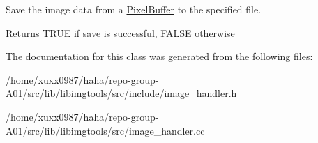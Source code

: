 Save the image data from a \hyperlink{classimage__tools_1_1PixelBuffer}{Pixel\+Buffer} to the specified file. 

\begin{DoxyReturn}{Returns}
T\+R\+UE if save is successful, F\+A\+L\+SE otherwise 
\end{DoxyReturn}


The documentation for this class was generated from the following files\+:\begin{DoxyCompactItemize}
\item 
/home/xuxx0987/haha/repo-\/group-\/\+A01/src/lib/libimgtools/src/include/image\+\_\+handler.\+h\item 
/home/xuxx0987/haha/repo-\/group-\/\+A01/src/lib/libimgtools/src/image\+\_\+handler.\+cc\end{DoxyCompactItemize}
